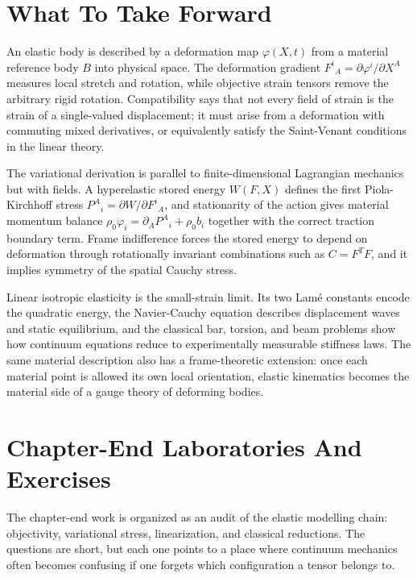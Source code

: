 \section{What To Take Forward}
\label{sec:elastic-body-take-forward}

An elastic body is described by a deformation map \(\varphi(X,t)\) from a
material reference body \(B\) into physical space. The deformation gradient
\(F^i{}_A=\partial\varphi^i/\partial X^A\) measures local stretch and rotation,
while objective strain tensors remove the arbitrary rigid rotation.
Compatibility says that not every field of strain is the strain of a
single-valued displacement; it must arise from a deformation with commuting
mixed derivatives, or equivalently satisfy the Saint-Venant conditions in the
linear theory.

The variational derivation is parallel to finite-dimensional Lagrangian
mechanics but with fields. A hyperelastic stored energy \(W(F,X)\) defines the
first Piola-Kirchhoff stress \(P^A{}_i=\partial W/\partial F^i{}_A\), and
stationarity of the action gives material momentum balance
\(\rho_0\ddot\varphi_i=\partial_A P^A{}_i+\rho_0 b_i\) together with the
correct traction boundary term. Frame indifference forces the stored energy to
depend on deformation through rotationally invariant combinations such as
\(C=F^T F\), and it implies symmetry of the spatial Cauchy stress.

Linear isotropic elasticity is the small-strain limit. Its two Lam\'e constants
encode the quadratic energy, the Navier-Cauchy equation describes displacement
waves and static equilibrium, and the classical bar, torsion, and beam problems
show how continuum equations reduce to experimentally measurable stiffness
laws. The same material description also has a frame-theoretic extension:
once each material point is allowed its own local orientation, elastic
kinematics becomes the material side of a gauge theory of deforming bodies.

\section{Chapter-End Laboratories And Exercises}
\label{sec:elastic-body-chapter-end-labs}

The chapter-end work is organized as an audit of the elastic modelling chain:
objectivity, variational stress, linearization, and classical reductions. The
questions are short, but each one points to a place where continuum mechanics
often becomes confusing if one forgets which configuration a tensor belongs to.

